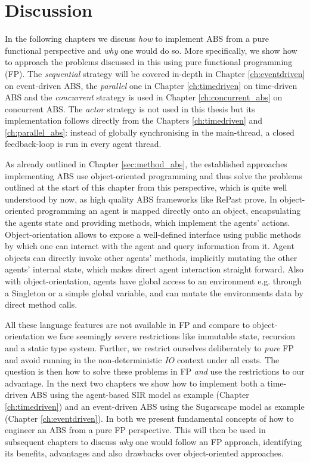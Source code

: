 \section{Discussion}
In the following chapters we discuss \textit{how} to implement ABS from a pure functional perspective and \textit{why} one would do so. More specifically, we show how to approach the problems discussed in this using pure functional programming (FP). The \textit{sequential} strategy will be covered in-depth in Chapter \ref{ch:eventdriven} on event-driven ABS, the \textit{parallel} one in Chapter \ref{ch:timedriven} on time-driven ABS and the \textit{concurrent} strategy is used in Chapter \ref{ch:concurrent_abs} on concurrent ABS. The \textit{actor} strategy is not used in this thesis but its implementation follows directly from the Chapters \ref{ch:timedriven} and \ref{ch:parallel_abs}: instead of globally synchronising in the main-thread, a closed feedback-loop is run in every agent thread. 

As already outlined in Chapter \ref{sec:method_abs}, the established approaches implementing ABS use object-oriented programming and thus solve the problems outlined at the start of this chapter from this perspective, which is quite well understood by now, as high quality ABS frameworks like RePast \cite{north_complex_2013} prove. In object-oriented programming an agent is mapped directly onto an object, encapsulating the agents state and providing methods, which implement the agents' actions. Object-orientation allows to expose a well-defined interface using public methods by which one can interact with the agent and query information from it. Agent objects can directly invoke other agents' methods, implicitly mutating the other agents' internal state, which makes direct agent interaction straight forward. Also with object-orientation, agents have global access to an environment e.g. through a Singleton or a simple global variable, and can mutate the environments data by direct method calls.

All these language features are not available in FP and compare to object-orientation we face seemingly severe restrictions like immutable state, recursion and a static type system. Further, we restrict ourselves deliberately to \textit{pure} FP and avoid running in the non-deterministic \textit{IO} context under all costs. The question is then how to solve these problems in FP \textit{and} use the restrictions to our advantage. In the next two chapters we show how to implement both a time-driven ABS  using the agent-based SIR model as example (Chapter \ref{ch:timedriven}) and an event-driven ABS using the Sugarscape model as example (Chapter \ref{ch:eventdriven}). In both we present fundamental concepts of how to engineer an ABS from a pure FP perspective. This will then be used in subsequent chapters to discuss \textit{why} one would follow an FP approach, identifying its benefits, advantages and also drawbacks over object-oriented approaches. 

